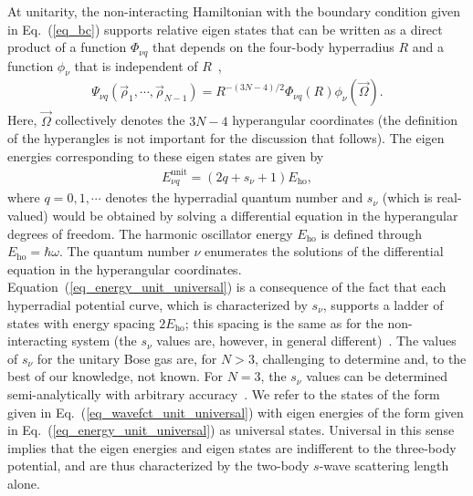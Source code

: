 \documentclass[aps,pra,twocolumn,showpacs,superscriptaddress]{revtex4}
\begin{document}
At unitarity, the non-interacting Hamiltonian with the
boundary condition given in Eq.~(\ref{eq_bc})
supports relative eigen states that can be written as
a direct product
of a function $\Phi_{\nu q}$ that depends on the 
four-body hyperradius $R$
and a function $\phi_{\nu}$ that is independent 
of $R$~\cite{werner2006PRA,castin2004,tan2004},
\begin{eqnarray}
\label{eq_wavefct_unit_universal}
\Psi_{\nu q}(\vec{\rho}_1,\cdots,\vec{\rho}_{N-1})=
R^{-(3N-4)/2}
\Phi_{\nu q}(R) \phi_{\nu}(\vec{\Omega}).
\end{eqnarray}
Here, $\vec{\Omega}$ collectively denotes
the $3N-4$ hyperangular coordinates
(the definition of the hyperangles is not important for the 
discussion that follows).
The eigen energies corresponding to these eigen states
are given by
\begin{eqnarray}
\label{eq_energy_unit_universal}
E_{\nu q}^{\text{unit}} = 
( 2 q + s_{\nu} + 1) E_{\text{ho}},
\end{eqnarray}
where $q = 0, 1,\cdots$ denotes the
hyperradial quantum number and
$s_{\nu}$ (which is real-valued) 
would be obtained by solving a differential equation
in the hyperangular degrees of freedom.
The harmonic oscillator energy $E_{\text{ho}}$ is defined
through $E_{\text{ho}}= \hbar \omega$.
The quantum number $\nu$ enumerates the solutions of the 
differential equation in the hyperangular coordinates.
Equation~(\ref{eq_energy_unit_universal}) is a consequence of the
fact that each hyperradial potential curve, which is characterized
by $s_{\nu}$, supports a ladder of states with energy spacing
$2 E_{\text{ho}}$; this spacing 
is the same as for the non-interacting system
(the $s_{\nu}$ values are,
however, in general different)~\cite{werner2006PRA}.
The values of $s_{\nu}$ for the unitary Bose gas
are, for $N>3$, challenging to determine
and, to the best of our knowledge, not known.
For $N=3$, the $s_{\nu}$ values can be determined semi-analytically
with arbitrary accuracy~\cite{braaten2006,efimov1971,efimov1973}.
We refer to the states of the form given in 
Eq.~(\ref{eq_wavefct_unit_universal}) with eigen energies of the form
given in Eq.~(\ref{eq_energy_unit_universal})
as universal states.
Universal in this sense implies that the eigen energies
and eigen states are indifferent to the three-body potential, and 
are thus characterized by the two-body $s$-wave scattering
length alone.
\end{document}
